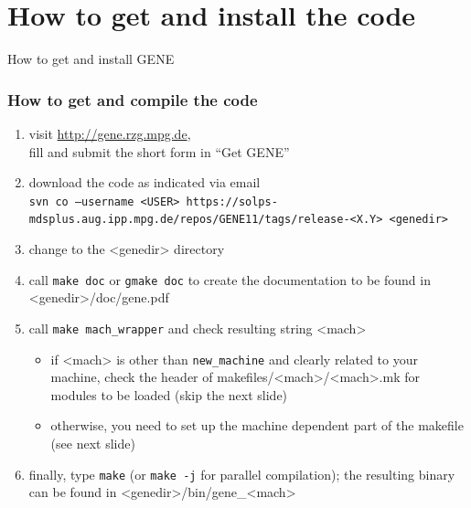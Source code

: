 \documentclass[10pt]{beamer}
\begin{document}
\section{How to get and install the code}

\begin{frame}[plain]

\begin{center}

\begin{exampleblock}

\begin{center}
\LARGE
How to get and install GENE
\end{center}
\end{exampleblock}

\end{center}
\end{frame}


\begin{frame}
  \frametitle{How to get and compile the code}

\begin{block}{}
 \begin{enumerate}
  \item visit \url{http://gene.rzg.mpg.de},\\
fill and submit the short form in ``Get GENE''\\[1ex]
  \item download the code as indicated via email\\
{\tt \tiny svn co --username <USER> https://solps-mdsplus.aug.ipp.mpg.de/repos/GENE11/tags/release-<X.Y> <genedir>}\\[1ex]
  \item change to the <genedir> directory\\[1ex]
  \item call {\tt make doc} or {\tt gmake doc} to create the documentation to be found in <genedir>/doc/gene.pdf\\[1ex]
  \item call {\tt make mach\_wrapper} and check resulting string <mach>
\begin{itemize}
 \item if <mach> is other than {\tt new\_machine} and clearly related to your machine, check the header of makefiles/<mach>/<mach>.mk for modules to be loaded (skip the next slide)
 \item otherwise, you need to set up the machine dependent part of the makefile (see next slide)
\end{itemize}
 \item finally, type {\tt make} (or {\tt make -j} for parallel compilation); the resulting binary can be found in <genedir>/bin/gene\_<mach>
 \end{enumerate}
\end{block}


\end{frame}
\end{document}
